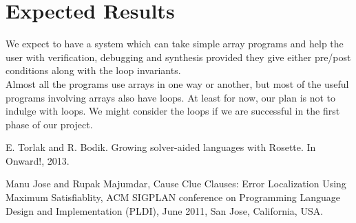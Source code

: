 \documentclass[a4paper, 12pt, notitlepage] {article}
\begin{document}
\section{Expected Results}
We expect to have a system which can take simple array programs and help the user with verification, debugging and synthesis provided they give either pre/post conditions along with the loop invariants.
\\
Almost all the programs use arrays in one way or another, but most of the useful programs involving arrays also have loops. At least for now, our plan is not to indulge with loops. We might consider the loops if we are successful in the first phase of our project. 


\begin{thebibliography}{unsrt}
	
	E. Torlak and R. Bodik. Growing solver-aided languages with Rosette. In Onward!, 2013.
	
	Manu Jose and Rupak Majumdar, Cause Clue Clauses: Error Localization Using Maximum Satisfiablity, ACM SIGPLAN conference on Programming Language Design and Implementation (PLDI), June 2011, San Jose, California, USA.
	
\end{thebibliography}
\end{document}
